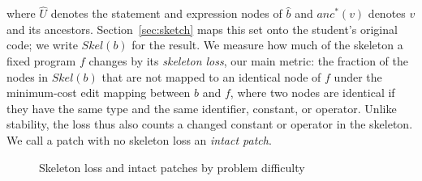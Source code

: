 \documentclass[10pt,conference]{IEEEtran}
\begin{document}
where $\hat{U}$ denotes the statement and expression nodes of $\hat{b}$ and $\mathit{anc}^{*}(v)$ denotes $v$ and its ancestors. Section~\ref{sec:sketch} maps this set onto the student's original code; we write $\mathit{Skel}(b)$ for the result. We measure how much of the skeleton a fixed program $f$ changes by its \emph{skeleton loss}, our main metric: the fraction of the nodes in $\mathit{Skel}(b)$ that are not mapped to an identical node of $f$ under the minimum-cost edit mapping between $b$ and $f$, where two nodes are identical if they have the same type and the same identifier, constant, or operator. Unlike stability, the loss thus also counts a changed constant or operator in the skeleton. We call a patch with no skeleton loss an \emph{intact patch}.

\begin{figure}[h]
\centering
{}
\caption{Skeleton loss and intact patches by problem difficulty}
\label{fig:limit}
\end{figure}
\end{document}
